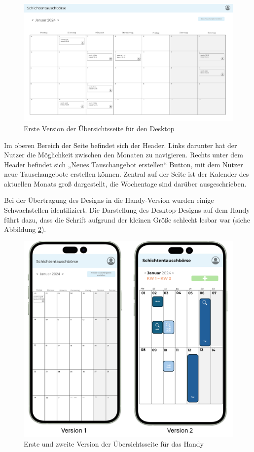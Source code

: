 \begin{figure}[h]
    \centering
    \includegraphics[clip,width=0.9\linewidth]{images/Version1_Desktop.png}
    \caption[Erste Version der Übersichtsseite für den Desktop]{Erste Version der Übersichtsseite für den Desktop}
    \label{Version1_Desktop}
\end{figure}

Im oberen Bereich der Seite befindet sich der Header. 
Links darunter hat der Nutzer die Möglichkeit zwischen den Monaten zu navigieren. 
Rechts unter dem Header befindet sich „Neues Tauschangebot erstellen“ Button, mit dem Nutzer neue Tauschangebote erstellen können. 
Zentral auf der Seite ist der Kalender des aktuellen Monats groß dargestellt, die Wochentage sind darüber ausgeschrieben.

Bei der Übertragung des Designs in die Handy-Version wurden einige Schwachstellen identifiziert. Die Darstellung des Desktop-Designs auf dem Handy führt dazu, dass die Schrift aufgrund der kleinen Größe schlecht lesbar war (siehe Abbildung \ref{Version12_Handy}). 

\begin{figure}[h]
    \centering
    \includegraphics[clip,width=0.75\linewidth]{images/Version12_Handy.png}
    \caption[Erste und zweite Version der Übersichtsseite für das Handy]{Erste und zweite Version der Übersichtsseite für das Handy}
    \label{Version12_Handy}
\end{figure}

